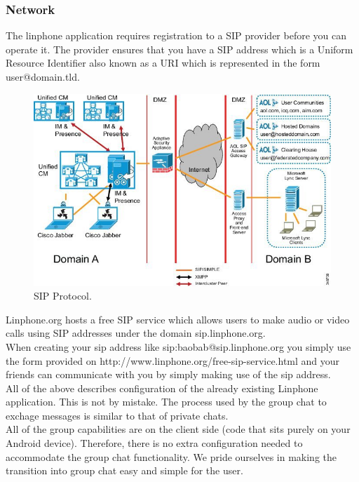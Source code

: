 \documentclass[a4paper]{article}
\begin{document}
\subsubsection{Network}
The linphone application requires registration to a SIP provider before you can operate it. The provider ensures that you have a SIP address which is a Uniform Resource Identifier also known as a URI which is represented in the form user@domain.tld. \\


\begin{center}
\begin{figure}[h]
\centering
\includegraphics[width=0.5\linewidth]{./pictures/sip.jpg}
\caption{\label{fig:Agile}SIP Protocol.}
\end{figure}
\end{center}

Linphone.org hosts a free SIP service which allows users to make audio or video calls using SIP addresses under the domain sip.linphone.org. \\
When creating your sip address like sip:baobab@sip.linphone.org you simply use the form provided on http://www.linphone.org/free-sip-service.html and your friends can communicate with you by simply making use of the sip address.
\\

All of the above describes configuration of the already existing Linphone application. This is not by mistake. The process used by the group chat to exchage messages is similar to that of private chats.
\\

All of the group capabilities are on the client side (code that sits purely on your Android device). Therefore, there is no extra configuration needed to accommodate the group chat functionality. We pride ourselves in making the transition into group chat easy and simple for the user.
\end{document}
